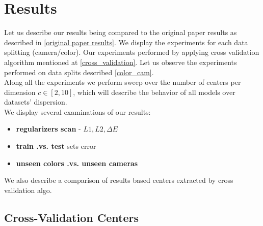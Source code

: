 \section{Results}

Let us describe our results being compared to the original paper results as described in \ref{original paper results}.
We display the experiments for each data splitting (camera/color). 
Our experiments performed by applying cross validation algorithm mentioned at  \ref{cross_validation}.
Let us observe the experiments performed on data splits described \ref{color_cam}.
\\

Along all the experiments we perform sweep over the number of centers per dimension $c \in [2,10]$, which will describe the behavior of all models over datasets' dispersion.
\\
We display several examinations of our results:
\begin{itemize}
	\item \textbf{regularizers scan} - $L1, L2, \Delta E$
	\item \textbf{train .vs. test} sets error
	\item \textbf{unseen colors .vs. unseen cameras}	
\end{itemize}
We also describe a comparison of results based centers extracted by cross validation algo.


\subsection{Cross-Validation Centers}

